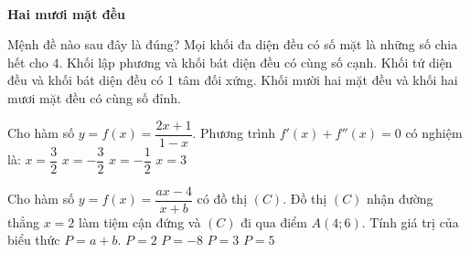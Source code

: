 \begin{ex}
\begin{minipage}[h]{0.5\textwidth}
\begin{center}
\\
			{\color{auburn} \textbf{Hai mươi mặt đều}}
		\end{center}
	\end{minipage}
	Mệnh đề nào sau đây là đúng?
	\choice
	{Mọi khối đa diện đều có số mặt là những số chia hết cho $4$.}
	{\True Khối lập phương và khối bát diện đều có cùng số cạnh.}
	{Khối tứ diện đều và khối bát diện đều có 1 tâm đối xứng.}
	{Khối mười hai mặt đều và khối hai mươi mặt đều có cùng số đỉnh.}
	\end{ex}
\begin{ex}%
	Cho hàm số $y=f(x)=\dfrac{2x+1}{1-x}$. Phương trình $f'(x)+f''(x)=0$ có nghiệm là:
	\choice
	{ $x=\dfrac{3}{2}$}
	{$x=-\dfrac{3}{2}$}
	{$x=-\dfrac{1}{2}$}
	{ \True $x=3$}
\end{ex}

\begin{ex}%
	Cho hàm số $y=f(x)=\dfrac{ax-4}{x+b}$ có đồ thị $(C)$. Đồ thị $(C)$ nhận đường thẳng $x=2$ làm tiệm cận đứng và $(C)$ đi qua điểm $A(4;6)$. Tính giá trị của biểu thức $P=a+b$.
	\choice
	{\True $P=2$}
	{$P=-8$}
	{$P=3$}
	{ $P=5$}
\end{ex}

